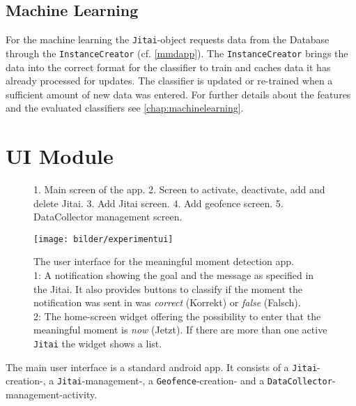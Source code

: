 \documentclass[a4paper]{report}
\begin{document}
\subsection{Machine Learning}
For the machine learning the \texttt{Jitai}-object requests data from the Database through the \texttt{InstanceCreator} (cf. \autoref{mmdapp}). The \texttt{InstanceCreator} brings the data into the correct format for the classifier to train and caches data it has already processed for updates. The classifier is updated or re-trained when a sufficient amount of new data was entered. For further details about the features and the evaluated classifiers see \autoref{chap:machinelearning}.
\section{UI Module}\label{ui}
\begin{figure}
  \vspace{-2.5cm}
  \captionsetup{singlelinecheck=off}
  \caption[The five main screens of the app.]{\label{appui}
    1. Main screen of the app. %
    2. Screen to activate, deactivate, add and delete Jitai. %
    3. Add Jitai screen. %
    4. Add geofence screen. %
    5. DataCollector management screen.%
  }%
\end{figure}
\begin{figure}
  \centering
  \texttt{[image: bilder/experimentui]}
  \caption{The user interface for the meaningful moment detection app. \\1: A notification showing the goal and the message as specified in the Jitai. It also provides buttons to classify if the moment the notification was sent in was \emph{correct} (Korrekt) or \emph{false} (Falsch). \\2: The home-screen widget offering the possibility to enter that the meaningful moment is \emph{now} (Jetzt). If there are more than one active \texttt{Jitai} the widget shows a list. \label{exui2}}
\end{figure}
The main user interface is a standard android app. It consists of a \texttt{Jitai}-creation-, a \texttt{Jitai}-management-, a \texttt{Geofence}-creation- and a \texttt{DataCollector}-management-activity.
\end{document}
